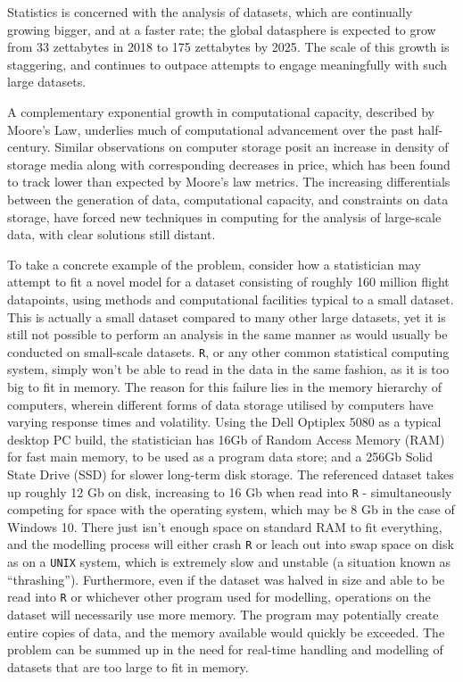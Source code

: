 Statistics is concerned with the analysis of datasets, which are continually growing bigger, and at a faster rate;
the global datasphere is expected to grow from 33 zettabytes in 2018 to 175 zettabytes by 2025\cite{rydning2018digitization}.
The scale of this growth is staggering, and continues to outpace attempts to engage meaningfully with such large datasets.

A complementary exponential growth in computational capacity, described by Moore's Law, underlies much of computational advancement over the past half-century\cite{moore1975progress}.
Similar observations on computer storage posit an increase in density of storage media along with corresponding decreases in price, which has been found to track lower than expected by Moore's law metrics\cite{fontana2018moore}.
The increasing differentials between the generation of data, computational capacity, and constraints on data storage, have forced new techniques in computing for the analysis of large-scale data, with clear solutions still distant.

To take a concrete example of the problem, consider how a statistician may attempt to fit a novel model for a dataset consisting of roughly 160 million flight datapoints\cite{bot2009flights}, using methods and computational facilities typical to a small dataset.
This is actually a small dataset compared to many other large datasets, yet it is still not possible to perform an analysis in the same manner as would usually be conducted on small-scale datasets.
\texttt{R}, or any other common statistical computing system, simply won't be able to read in the data in the same fashion, as it is too big to fit in memory.
The reason for this failure lies in the memory hierarchy of computers, wherein different forms of data storage utilised by computers have varying response times and volatility.
Using the Dell Optiplex 5080 as a typical desktop PC build, the statistician has 16Gb of Random Access Memory (RAM) for fast main memory, to be used as a program data store; and a 256Gb Solid State Drive (SSD) for slower long-term disk  storage\cite{cornell2021standardcomp}.
The referenced dataset takes up roughly 12 Gb on disk, increasing to 16 Gb when read into \texttt{R} - simultaneously competing for space with the operating system, which may be 8 Gb in the case of Windows 10.
There just isn't enough space on standard RAM to fit everything, and the modelling process will either crash \texttt{R} or leach out into swap space on disk as on a \texttt{UNIX} system, which is extremely slow and unstable (a situation known as ``thrashing'')\cite{denning1968thrashing}.
Furthermore, even if the dataset was halved in size and able to be read into \texttt{R} or whichever other program used for modelling, operations on the dataset will necessarily use more memory.
The program may potentially create entire copies of data, and the memory available would quickly be exceeded.
The problem can be summed up in the need for real-time handling and modelling of datasets that are too large to fit in memory.

